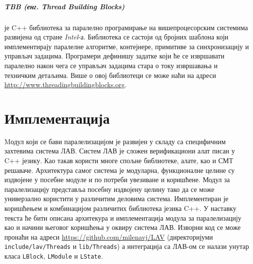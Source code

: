 \documentclass[12pt,oneside]{memoir}
\begin{document}
\paragraph{TBB (енг. Thread Building Blocks)} је C++ библиотека за паралелно програмирање на вишепроцесорским системима развијена од стране \emph{Intel}-а. Библиотека се састоји од бројних шаблона који имплементирају паралелне алгоритме, контејнере, примитиве за синхронизацију и управљач задацима. Програмери дефинишу задатке који ће се извршавати паралелно након чега се управљач задацима стара о току извршавања и техничким детаљима. Више о овој библиотеци се може наћи на адреси \url{http://www.threadingbuildingblocks.org}.


  
\chapter{Имплементација}

Mодул који се бави паралелизацијом је развијен у складу са специфичним захтевима система ЛАВ. Систем ЛАВ је сложен верификациони алат писан у C++ језику. Као такав користи многе спољне библиотеке, алате, као и СМТ решаваче.  Архитектура самог система је модуларна, функционалне целине су издвојене у посебне модуле и по потреби увезиване и коришћене. Модул за паралелизацију представља посебну издвојену целину тако да се може универзално користити у различитим деловима система. Имплементиран је коришћењем  и комбинацијом различитих библиотека језика C++.   У наставку текста ће бити описана архитекура и имплементација модула за паралелизацију као и начини његовог коришћења у оквиру система ЛАВ. Изворни код се може пронаћи на адреси \url{https://github.com/milenavj/LAV} (директоријуми \texttt{include/lav/Threads} и \texttt{lib/Threads}) а интеграција са ЛАВ-ом се налази унутар класа \texttt{LBlock}, \texttt{LModule} и \texttt{LState}.  
\end{document}
